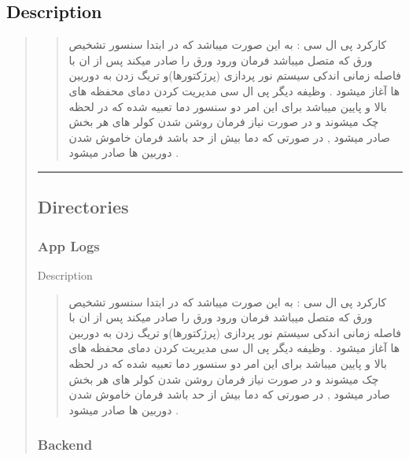 \documentclass[letterpaper,10pt,english]{sphinxmanual}
\begin{document}
\subsection{Description}
\label{\detokenize{Setting Software:description}}\begin{quote}

\sphinxAtStartPar
\begin{quote}\begin{farsi}
کارکرد پی ال سی : به این صورت میباشد که در ابتدا سنسور تشخیص ورق که متصل میباشد فرمان ورود ورق را صادر میکند پس از ان با فاصله زمانی اندکی سیستم نور پردازی (پرژکتورها)و تریگ زدن به دوربین ها آغاز میشود . وظیفه دیگر پی ال سی مدیریت کردن دمای محفظه های بالا و پایین میباشد برای این امر دو سنسور دما تعبیه شده که در لحظه چک میشوند و در صورت نیاز فرمان روشن شدن کولر های هر بخش صادر میشود , در صورتی که دما بیش از حد باشد فرمان خاموش شدن دوربین ها صادر میشود .
\end{farsi}\end{quote}


\bigskip\hrule\bigskip



\subsection{Directories}
\label{\detokenize{Setting Software:directories}}
\sphinxstepscope


\subsubsection{App Logs}
\label{\detokenize{setting/app_logs Dir:app-logs}}\label{\detokenize{setting/app_logs Dir::doc}}
\sphinxAtStartPar
Description
\begin{quote}\begin{farsi}

\sphinxAtStartPar
کارکرد پی ال سی : به این صورت میباشد که در ابتدا سنسور تشخیص ورق که متصل میباشد فرمان ورود ورق را صادر میکند پس از ان با فاصله زمانی اندکی سیستم نور پردازی (پرژکتورها)و تریگ زدن به دوربین ها آغاز میشود . وظیفه دیگر پی ال سی مدیریت کردن دمای محفظه های بالا و پایین میباشد برای این امر دو سنسور دما تعبیه شده که در لحظه چک میشوند و در صورت نیاز فرمان روشن شدن کولر های هر بخش صادر میشود , در صورتی که دما بیش از حد باشد فرمان خاموش شدن دوربین ها صادر میشود .
\end{farsi}\end{quote}

\sphinxstepscope


\subsubsection{Backend}
\label{\detokenize{setting/backend Dir:backend}}\label{\detokenize{setting/backend Dir::doc}}


\end{quote}
\end{document}
